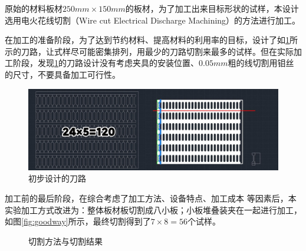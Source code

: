原始的材料板材$ 250mm\times 150mm $的板材，为了加工出来目标形状的试样，本设计选用电火花线切割（Wire cut Electrical Discharge Machining）的方法进行加工。

在加工的准备阶段，为了达到节约材料、提高材料的利用率的目标，设计了如\ref{fig:badway}所示的刀路，让式样尽可能密集排列，用最少的刀路切割来最多的试样。但在实际加工阶段，发现\ref{fig:badway}的刀路设计没有考虑夹具的安装位置、$ 0.05mm $粗的线切割用钼丝的尺寸，不要具备加工可行性。
\begin{figure}[h!]
	\centering
	\includegraphics[width=0.8\linewidth]{pic/刀路初步}
	\caption{初步设计的刀路}
	\label{fig:badway}
\end{figure}

加工前的最后阶段，在综合考虑了加工方法、设备特点、加工成本%
等因素后，本实验加工方式改进为：整体板材板切割成八小板；小板堆叠装夹在一起进行加工，如图\ref{fig:goodway}所示，最终切割得到了$ 7\times 8=56 $个试样。
\begin{figure}[h!]
	\centering
	\hspace{0.2in} %
	\caption{切割方法与切割结果}
\end{figure}

